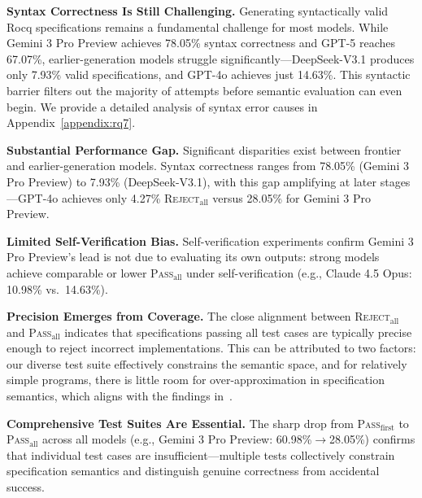 \textbf{Syntax Correctness Is Still Challenging.}
Generating syntactically valid Rocq specifications remains a fundamental challenge for most models. While Gemini 3 Pro Preview achieves 78.05\% syntax correctness and GPT-5 reaches 67.07\%, earlier-generation models struggle significantly—DeepSeek-V3.1 produces only 7.93\% valid specifications, and GPT-4o achieves just 14.63\%. This syntactic barrier filters out the majority of attempts before semantic evaluation can even begin. We provide a detailed analysis of syntax error causes in Appendix~\ref{appendix:rq7}.


\textbf{Substantial Performance Gap.}
Significant disparities exist between frontier and earlier-generation models. Syntax correctness ranges from 78.05\% (Gemini 3 Pro Preview) to 7.93\% (DeepSeek-V3.1), with this gap amplifying at later stages—GPT-4o achieves only 4.27\% \textsc{Reject}$_{\text{all}}$ versus 28.05\% for Gemini 3 Pro Preview.

\textbf{Limited Self-Verification Bias.}
Self-verification experiments confirm Gemini 3 Pro Preview's lead is not due to evaluating its own outputs: strong models achieve comparable or lower \textsc{Pass}$_{\text{all}}$ under self-verification (e.g., Claude 4.5 Opus: 10.98\% vs.\ 14.63\%).

\textbf{Precision Emerges from Coverage.}
The close alignment between \textsc{Reject}$_{\text{all}}$ and \textsc{Pass}$_{\text{all}}$ indicates that specifications passing all test cases are typically precise enough to reject incorrect implementations. This can be attributed to two factors: our diverse test suite effectively constrains the semantic space, and for relatively simple programs, there is little room for over-approximation in specification semantics, which aligns with the findings in~\cite{le2025can}.

\textbf{Comprehensive Test Suites Are Essential.}
The sharp drop from \textsc{Pass}$_{\text{first}}$ to \textsc{Pass}$_{\text{all}}$ across all models (e.g., Gemini 3 Pro Preview: 60.98\%$\to$28.05\%) confirms that individual test cases are insufficient—multiple tests collectively constrain specification semantics and distinguish genuine correctness from accidental success.


